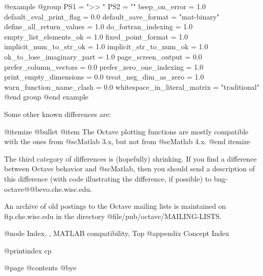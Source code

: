 @example
@group
  PS1 = ">> "
  PS2 = ""
  beep_on_error = 1.0
  default_eval_print_flag = 0.0
  default_save_format = "mat-binary"
  define_all_return_values = 1.0
  do_fortran_indexing = 1.0
  empty_list_elements_ok = 1.0
  fixed_point_format = 1.0
  implicit_num_to_str_ok = 1.0
  implicit_str_to_num_ok = 1.0
  ok_to_lose_imaginary_part = 1.0
  page_screen_output = 0.0
  prefer_column_vectors = 0.0
  prefer_zero_one_indexing = 1.0
  print_empty_dimensions = 0.0
  treat_neg_dim_as_zero = 1.0
  warn_function_name_clash = 0.0
  whitespace_in_literal_matrix = "traditional"
@end group
@end example

Some other known differences are:

@itemize @bullet
@item
The Octave plotting functions are mostly compatible with the ones from
@sc{Matlab} 3.x, but not from @sc{Matlab} 4.x.
@end itemize

The third category of differences is (hopefully) shrinking.  If you find
a difference between Octave behavior and @sc{Matlab}, then you should send a
description of this difference (with code illustrating the difference,
if possible) to bug-octave@@bevo.che.wisc.edu.

An archive of old postings to the Octave mailing lists is maintained
on ftp.che.wisc.edu in the directory @file{/pub/octave/MAILING-LISTS}.

@node Index,  , MATLAB compatibility, Top
@appendix Concept Index

@printindex cp

@page
@contents
@bye
